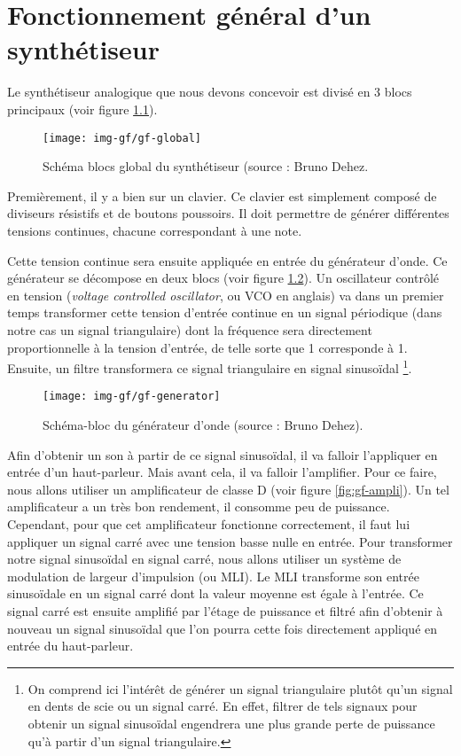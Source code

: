 \chapter{Fonctionnement général d'un synthétiseur}
Le synthétiseur analogique que nous devons concevoir
est divisé en 3 blocs principaux (voir figure \ref{fig:gf-global}).

\begin{figure}[ht]
	\centering
	\texttt{[image: img-gf/gf-global]}
	\caption{Schéma blocs global du synthétiseur (source : Bruno Dehez.}
	\label{fig:gf-global}
\end{figure}

Premièrement, il y a bien sur un clavier. Ce clavier est simplement
composé de diviseurs résistifs et de boutons poussoirs. Il doit
permettre de générer différentes tensions continues, chacune
correspondant à une note.

Cette tension continue sera ensuite appliquée en entrée du générateur
d'onde. Ce générateur se décompose en deux blocs (voir figure
\ref{fig:gf-generator}). Un oscillateur contrôlé en tension 
(\textit{voltage controlled oscillator}, ou VCO en anglais) va dans
un premier temps transformer cette tension d'entrée continue
en un signal périodique (dans notre cas un signal triangulaire) 
dont la fréquence sera directement proportionnelle
à la tension d'entrée, de telle sorte que
\unit{1}{\milli\volt} corresponde à \unit{1}{\hertz}. Ensuite, un filtre
transformera ce signal triangulaire en signal sinusoïdal
\footnote{On comprend ici l'intérêt de générer un signal triangulaire plutôt
qu'un signal en dents de scie ou un signal carré. En effet, filtrer
de tels signaux pour obtenir un signal sinusoïdal engendrera
une plus grande perte de puissance qu'à partir d'un signal
triangulaire.}.

\begin{figure}[ht]
	\centering
	\texttt{[image: img-gf/gf-generator]}
	\caption{Schéma-bloc du générateur d'onde (source : Bruno Dehez).}
	\label{fig:gf-generator}
\end{figure}

Afin d'obtenir un son à partir de ce signal sinusoïdal, il
va falloir l'appliquer en entrée d'un haut-parleur. Mais avant
cela, il va falloir l'amplifier. Pour ce faire, nous allons
utiliser un amplificateur de classe D (voir figure
\ref{fig:gf-ampli}). Un tel amplificateur
a un très bon rendement, il consomme peu de puissance. Cependant,
pour que cet amplificateur fonctionne correctement, il faut
lui appliquer un signal carré avec une tension basse nulle en entrée. Pour transformer
notre signal sinusoïdal en signal carré, nous allons utiliser un
système de modulation de largeur d'impulsion (ou MLI). Le MLI
transforme son entrée sinusoïdale en un signal carré dont la
valeur moyenne est égale à l'entrée. Ce
signal carré est ensuite amplifié par l'étage de puissance
et filtré afin d'obtenir à nouveau un signal sinusoïdal que
l'on pourra cette fois directement appliqué en entrée du haut-parleur.

